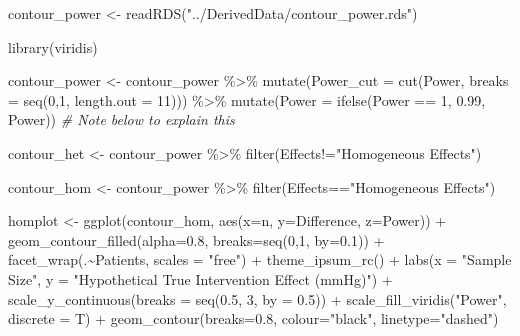 \documentclass[
]{article}
\newenvironment{Shaded}{\begin{snugshade}}{\end{snugshade}}
\newcommand{\AttributeTok}[1]{\textcolor[rgb]{0.77,0.63,0.00}{#1}}
\newcommand{\CommentTok}[1]{\textcolor[rgb]{0.56,0.35,0.01}{\textit{#1}}}
\newcommand{\DecValTok}[1]{\textcolor[rgb]{0.00,0.00,0.81}{#1}}
\newcommand{\FloatTok}[1]{\textcolor[rgb]{0.00,0.00,0.81}{#1}}
\newcommand{\FunctionTok}[1]{\textcolor[rgb]{0.00,0.00,0.00}{#1}}
\newcommand{\NormalTok}[1]{#1}
\newcommand{\OtherTok}[1]{\textcolor[rgb]{0.56,0.35,0.01}{#1}}
\newcommand{\SpecialCharTok}[1]{\textcolor[rgb]{0.00,0.00,0.00}{#1}}
\newcommand{\StringTok}[1]{\textcolor[rgb]{0.31,0.60,0.02}{#1}}
\begin{document}
\begin{Shaded}
\begin{Highlighting}[]
\NormalTok{contour\_power }\OtherTok{\textless{}{-}} \FunctionTok{readRDS}\NormalTok{(}\StringTok{"../DerivedData/contour\_power.rds"}\NormalTok{)}

\FunctionTok{library}\NormalTok{(viridis)}

\NormalTok{contour\_power }\OtherTok{\textless{}{-}}\NormalTok{ contour\_power }\SpecialCharTok{\%\textgreater{}\%} 
  \FunctionTok{mutate}\NormalTok{(}\AttributeTok{Power\_cut =} \FunctionTok{cut}\NormalTok{(Power, }\AttributeTok{breaks =} \FunctionTok{seq}\NormalTok{(}\DecValTok{0}\NormalTok{,}\DecValTok{1}\NormalTok{, }\AttributeTok{length.out =} \DecValTok{11}\NormalTok{))) }\SpecialCharTok{\%\textgreater{}\%} 
  \FunctionTok{mutate}\NormalTok{(}\AttributeTok{Power =} \FunctionTok{ifelse}\NormalTok{(Power }\SpecialCharTok{==} \DecValTok{1}\NormalTok{, }\FloatTok{0.99}\NormalTok{, Power)) }\CommentTok{\# Note below to explain this}
                                                  

\NormalTok{contour\_het }\OtherTok{\textless{}{-}}\NormalTok{ contour\_power }\SpecialCharTok{\%\textgreater{}\%} 
  \FunctionTok{filter}\NormalTok{(Effects}\SpecialCharTok{!=}\StringTok{"Homogeneous Effects"}\NormalTok{)}

\NormalTok{contour\_hom }\OtherTok{\textless{}{-}}\NormalTok{ contour\_power }\SpecialCharTok{\%\textgreater{}\%} 
  \FunctionTok{filter}\NormalTok{(Effects}\SpecialCharTok{==}\StringTok{"Homogeneous Effects"}\NormalTok{)}


\NormalTok{homplot }\OtherTok{\textless{}{-}} \FunctionTok{ggplot}\NormalTok{(contour\_hom, }\FunctionTok{aes}\NormalTok{(}\AttributeTok{x=}\NormalTok{n, }\AttributeTok{y=}\NormalTok{Difference, }\AttributeTok{z=}\NormalTok{Power)) }\SpecialCharTok{+}
  \FunctionTok{geom\_contour\_filled}\NormalTok{(}\AttributeTok{alpha=}\FloatTok{0.8}\NormalTok{, }\AttributeTok{breaks=}\FunctionTok{seq}\NormalTok{(}\DecValTok{0}\NormalTok{,}\DecValTok{1}\NormalTok{, }\AttributeTok{by=}\FloatTok{0.1}\NormalTok{)) }\SpecialCharTok{+}
  \FunctionTok{facet\_wrap}\NormalTok{(.}\SpecialCharTok{\textasciitilde{}}\NormalTok{Patients, }\AttributeTok{scales =} \StringTok{"free"}\NormalTok{) }\SpecialCharTok{+}
  \FunctionTok{theme\_ipsum\_rc}\NormalTok{() }\SpecialCharTok{+}
  \FunctionTok{labs}\NormalTok{(}\AttributeTok{x =} \StringTok{"Sample Size"}\NormalTok{,}
       \AttributeTok{y =} \StringTok{"Hypothetical True Intervention Effect (mmHg)"}\NormalTok{) }\SpecialCharTok{+}
  \FunctionTok{scale\_y\_continuous}\NormalTok{(}\AttributeTok{breaks =} \FunctionTok{seq}\NormalTok{(}\FloatTok{0.5}\NormalTok{, }\DecValTok{3}\NormalTok{, }\AttributeTok{by =} \FloatTok{0.5}\NormalTok{)) }\SpecialCharTok{+}
  \FunctionTok{scale\_fill\_viridis}\NormalTok{(}\StringTok{"Power"}\NormalTok{, }\AttributeTok{discrete =}\NormalTok{ T) }\SpecialCharTok{+}
  \FunctionTok{geom\_contour}\NormalTok{(}\AttributeTok{breaks=}\FloatTok{0.8}\NormalTok{, }\AttributeTok{colour=}\StringTok{"black"}\NormalTok{, }\AttributeTok{linetype=}\StringTok{"dashed"}\NormalTok{)}



\end{Highlighting}
\end{Shaded}
\end{document}
